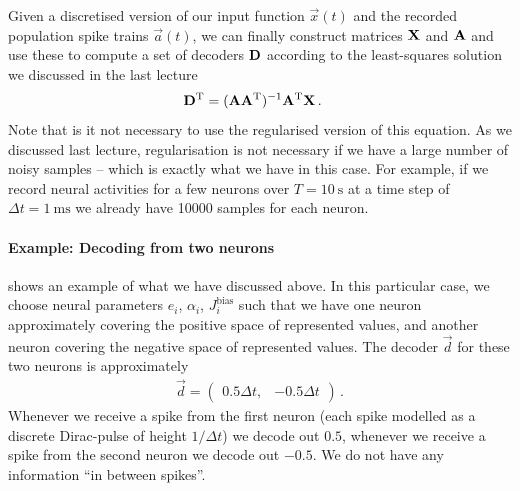 \documentclass[10pt,letterpaper,oneside]{article}
\begin{document}
Given a discretised version of our input function $\vec x(t)$ and the recorded population spike trains $\vec a(t)$, we can finally construct matrices ${\mathbf{X}}$ and ${\mathbf{A}}$ and use these to compute a set of decoders ${\mathbf{D}}$ according to the least-squares solution we discussed in the last lecture
\begin{align*}
	{\mathbf{D}}^{\mathrm{T}} &= ({\mathbf{A}} {\mathbf{A}}^{\mathrm{T}})^{-1} {\mathbf{A}}^{\mathrm{T}} {\mathbf{X}} \,.
\end{align*}
Note that is it not necessary to use the regularised version of this equation. As we discussed last lecture, regularisation is not necessary if we have a large number of noisy samples -- which is exactly what we have in this case. For example, if we record neural activities for a few neurons over $T = \SI{10}{\second}$ at a time step of $\Delta t = \SI{1}{\milli\second}$ we already have \num{10000} samples for each neuron.


\paragraph{Example: Decoding from two neurons}
 shows an example of what we have discussed above. In this particular case, we choose neural parameters $e_i$, $\alpha_i$, $J^\mathrm{bias}_i$ such that we have one neuron approximately covering the positive space of represented values, and another neuron covering the negative space of represented values. The decoder $\vec d$ for these two neurons is approximately
\begin{align*}
	\vec d = \begin{pmatrix} 0.5 \Delta t, & -0.5 \Delta t \end{pmatrix} \,.
\end{align*}
Whenever we receive a spike from the first neuron (each spike modelled as a discrete Dirac-pulse of height $1/\Delta t$) we decode out $0.5$, whenever we receive a spike from the second neuron we decode out $-0.5$. We do not have any information \enquote{in between spikes}.
\end{document}

